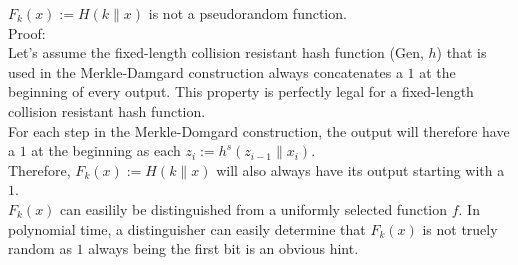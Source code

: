 $F_{k}(x) := H(k\parallel x)$ is not a pseudorandom function.\\
Proof:\\
Let's assume the fixed-length collision resistant hash function (Gen, $h$) that is used in the Merkle-Damgard construction always concatenates a $1$ at the beginning of every output. This property is perfectly legal for a fixed-length collision resistant hash function.\\
For each step in the Merkle-Domgard construction, the output will therefore have a $1$ at the beginning as each $z_{i} := h^{s}(z_{i-1}\parallel x_{i})$.\\
Therefore, $F_{k}(x) := H(k\parallel x)$ will also always have its output starting with a $1$.\\
$F_{k}(x)$ can easilily be distinguished from a uniformly selected function $f$. In polynomial time, a distinguisher can easily determine that $F_{k}(x)$ is not truely random as $1$ always being the first bit is an obvious hint.

